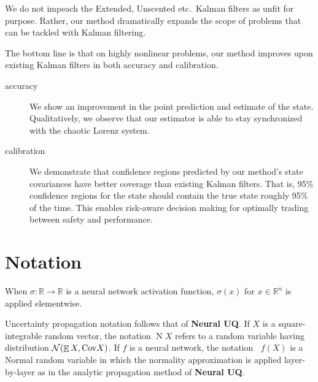 \documentclass{article} %
\newcommand{\neuralUQ}{{\color{red} \textbf{Neural UQ}}\xspace}
\DeclareMathOperator{\expect}{\mathbb{E}}
\DeclareMathOperator{\normal}{\mathrm N}
\DeclareMathOperator{\Normal}{\mathrm N^*}
\begin{document}
We do not impeach the Extended, Unscented etc.~Kalman filters as unfit for purpose.
Rather, our method dramatically expands the scope of problems that can be tackled with Kalman filtering.

The bottom line is that on highly nonlinear problems, our method improves upon existing Kalman filters in both accuracy and calibration.
\begin{description}
    \item[accuracy] We show an improvement in the point prediction and estimate of the state. Qualitatively, we observe that our estimator is able to stay synchronized with the chaotic Lorenz system.
    \item[calibration] We demonstrate that confidence regions predicted by our method's state covariances have better coverage than existing Kalman filters.
    That is, 95\% confidence regions for the state should contain the true state roughly 95\% of the time.
    This enables risk-aware decision making for optimally trading between safety and performance.
\end{description}

\section{Notation}
When \(\sigma:\mathbb R \to \mathbb R\) is a neural network activation function, \(\sigma (x)\) for \(x \in \mathbb{R}^n\) is applied elementwise.

Uncertainty propagation notation follows that of \neuralUQ.
If \(X\) is a square-integrable random vector, the notation \(\normal X\) refers to a random variable having distribution \(\mathcal N(\expect X, \Cov X)\).
If \(f\) is a neural network, the notation \(\Normal f(X)\) is a Normal random variable in which the normality approximation is applied layer-by-layer as in the analytic propagation method of \neuralUQ.



\end{document}
